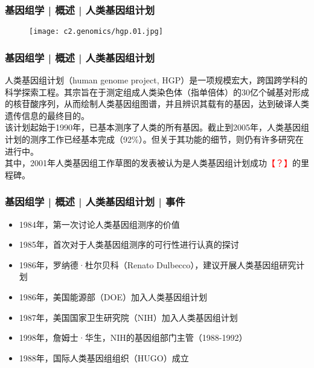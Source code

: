 \begin{frame}
  \frametitle{基因组学 | 概述 | 人类基因组计划}
  \begin{figure}
    \centering
    \texttt{[image: c2.genomics/hgp.01.jpg]}
  \end{figure}
\end{frame}

\begin{frame}
  \frametitle{基因组学 | 概述 | 人类基因组计划}
人类基因组计划（human genome project, HGP）是一项规模宏大，跨国跨学科的科学探索工程。其宗旨在于测定组成人类染色体（指单倍体）的30亿个碱基对形成的核苷酸序列，从而绘制人类基因组图谱，并且辨识其载有的基因，达到破译人类遗传信息的最终目的。\\
\vspace{1em}
该计划起始于1990年，已基本测序了人类的所有基因。截止到2005年，人类基因组计划的测序工作已经基本完成（92\%）。但关于其功能的细节，则仍有许多研究在进行中。\\
\vspace{1em}
其中，2001年人类基因组工作草图的发表被认为是人类基因组计划成功\textcolor{red}{【？】}的里程碑。
\end{frame}

\begin{frame}
  \frametitle{基因组学 | 概述 | 人类基因组计划 | 事件}
  \begin{itemize}[<+->]
    \item 1984年，第一次讨论人类基因组测序的价值
    \item 1985年，首次对于人类基因组测序的可行性进行认真的探讨
    \item 1986年，罗纳德·杜尔贝科（Renato Dulbecco），建议开展人类基因组研究计划
    \item 1986年，美国能源部（DOE）加入人类基因组计划
    \item 1987年，美国国家卫生研究院（NIH）加入人类基因组计划
    \item 1998年，詹姆士·华生，NIH的基因组部门主管（1988-1992）
    \item 1988年，国际人类基因组组织（HUGO）成立
  \end{itemize}
\end{frame}

